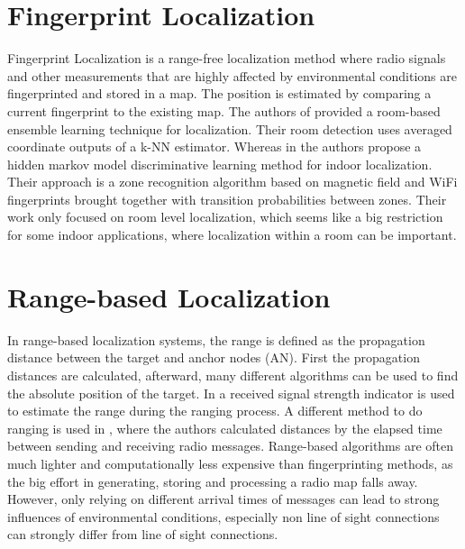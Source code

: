 \section{Fingerprint Localization}
Fingerprint Localization is a range-free localization method where radio signals and other measurements that are highly affected by environmental conditions are fingerprinted and stored in a map. The position is estimated by comparing a current fingerprint to the existing map. The authors of \cite{Taniuchi} provided a room-based ensemble learning technique for localization. Their room detection uses averaged coordinate outputs of a k-NN estimator. Whereas in \cite{Carrera2} the authors propose a hidden markov model discriminative learning method for indoor localization. Their approach is a zone recognition algorithm based on magnetic field and WiFi fingerprints brought together with transition probabilities between zones. Their work only focused on room level localization, which seems like a big restriction for some indoor applications, where localization within a room can be important.

\section{Range-based Localization}
In range-based localization systems, the range is defined as the propagation distance between the target and anchor nodes (AN). First the propagation distances are calculated, afterward, many different algorithms can be used to find the absolute position of the target. In \cite{Horus} a received signal strength indicator is used to estimate the range during the ranging process. A different method to do ranging is used in \cite{IEEE}, where the authors calculated distances by the elapsed time between sending and receiving radio messages. Range-based algorithms are often much lighter and computationally less expensive than fingerprinting methods, as the big effort in generating, storing and processing a radio map falls away. However, only relying on different arrival times of messages can lead to strong influences of environmental conditions, especially non line of sight connections can strongly differ from line of sight connections.

